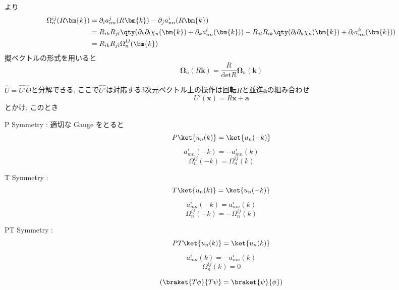 より
\begin{align*}
    \Omega^{ij}_n(R\bm{k}) & = \partial_i a^{j}_{nn}(R\bm{k}) - \partial_j a^{i}_{nn}(R\bm{k})\\
    & = R_{ik} R_{jl} \qty( \partial_k \partial_l \chi_n(\bm{k}) + \partial_k a^l_{nn} (\bm{k})) - R_{jl} R_{ik}  \qty( \partial_l \partial_k \chi_n(\bm{k}) + \partial_l a^k_{nn} (\bm{k}))\\
    & = R_{ik} R_{jl} \Omega^{kl}_n(\bm{k})
\end{align*}
擬ベクトルの形式を用いると
\begin{equation*}
    \bm{\Omega}_n (R \bm{k}) = \frac{R}{\mathrm{det}{R}} \bm{\Omega}_n (\bm{k})
\end{equation*}
\begin{theotcolorbox}[title = 時間反転を含む操作$\hat{U}$で対称なとき]
    $\hat{U} = \hat{U'} \hat{\Theta}$と分解できる, ここで$\hat{U'}$は対応する3次元ベクトル上の操作は回転$R$と並進$\bm{a}$の組み合わせ
    \begin{equation*}
        U'(\bm{x}) = R\bm{x} + \bm{a}
    \end{equation*}
    とかけ, このとき
\end{theotcolorbox}

P Symmetry : 適切な Gauge をとると
\begin{equation*}
    P\ket{u_n(k)} = \ket{u_n(-k)}
\end{equation*}
\begin{equation*}
    a^{i}_{mn}(-k) = - a^{i}_{mn}(k) 
\end{equation*}
\begin{equation*}
    \Omega^{ij}_n(-k) =  \Omega^{ij}_n(k)
\end{equation*}

T Symmetry : 
\begin{equation*}
    T\ket{u_n(k)} = \ket{u_n(-k)}
\end{equation*}
\begin{equation*}
    a^{i}_{mn}(-k) = a^{i}_{nm}(k)
\end{equation*}
\begin{equation*}
    \Omega^{ij}_n(-k) =  -\Omega^{ij}_n(k)
\end{equation*}

PT Symmetry :
\begin{equation*}
    PT\ket{u_n(k)} = \ket{u_n(k)}
\end{equation*}
\begin{equation*}
    a^{i}_{mn}(k) = -a^{i}_{nm}(k)
\end{equation*}
\begin{equation*}
    \Omega^{ij}_n(k) =  0
\end{equation*}

\begin{equation*}
    (\braket{T\phi}{T\psi} = \braket{\psi}{\phi})
\end{equation*}